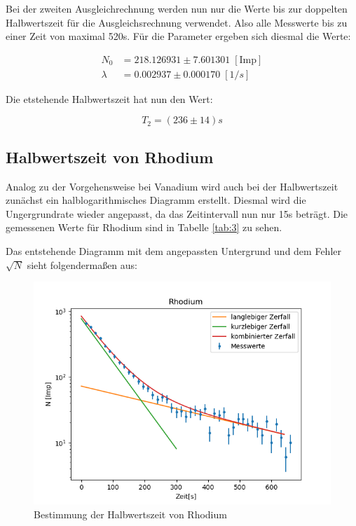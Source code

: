 \noindent Bei der zweiten Ausgleichrechnung werden nun nur die Werte bis zur doppelten Halbwertszeit für die Ausgleichsrechnung verwendet.
Also alle Messwerte bis zu einer Zeit von maximal 520s.
Für die Parameter ergeben sich diesmal die Werte:

\begin{align}
    N_0 &=  218.126931 \pm 7.601301 \; [\text{Imp}] \nonumber \\
    \lambda &= 0.002937 \pm 0.000170 \; [1/s] \nonumber 
\end{align}

\noindent Die etstehende Halbwertszeit hat nun den Wert:

\begin{displaymath}
    T_2 = (236 \pm 14) s 
\end{displaymath}

\subsection{Halbwertszeit von Rhodium}

Analog zu der Vorgehensweise bei Vanadium wird auch bei der Halbwertszeit zunächst ein halblogarithmisches Diagramm erstellt.
Diesmal wird die Ungergrundrate wieder angepasst, da das Zeitintervall nun nur 15s beträgt.
Die gemessenen Werte für Rhodium sind in Tabelle \ref{tab:3} zu sehen.

\noindent Das entstehende Diagramm mit dem angepassten Untergrund und dem Fehler $\sqrt{N}$ sieht folgendermaßen aus:

\begin{figure}[H]
    \centering
    \includegraphics{"3.png"}
    \caption{Bestimmung der Halbwertszeit von Rhodium}
    \label{Fig:HalbwertszeitRh}
\end{figure}

